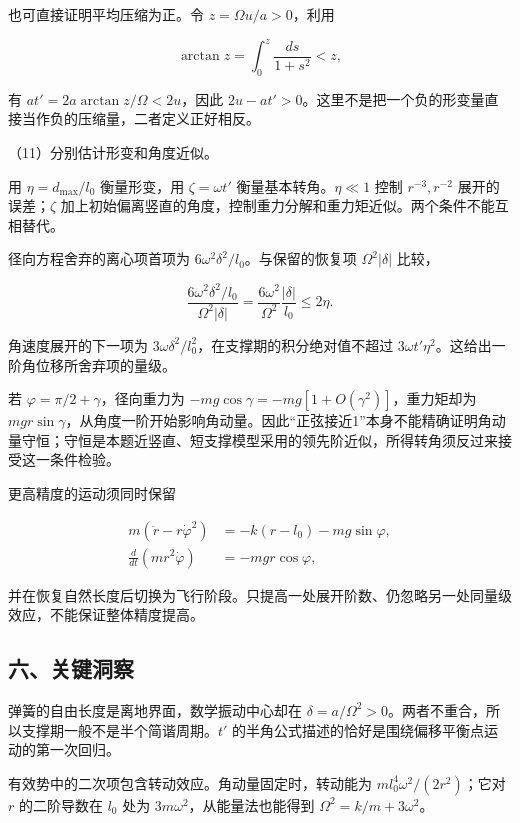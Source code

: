 \documentclass[12pt,a4paper,fontset=fandol]{ctexart}
\begin{document}
也可直接证明平均压缩为正。令 \(z=\Omega u/a>0\)，利用

\[
\arctan z=\int_0^z\frac{ds}{1+s^2}<z,
\]

有 \(at'=2a\arctan z/\Omega<2u\)，因此
\(2u-at'>0\)。这里不是把一个负的形变量直接当作负的压缩量，二者定义正好相反。

（11）分别估计形变和角度近似。

用 \(\eta=d_{\max}/l_0\) 衡量形变，用 \(\zeta=\omega t'\)
衡量基本转角。\(\eta\ll1\) 控制 \(r^{-3},r^{-2}\) 展开的误差；\(\zeta\)
加上初始偏离竖直的角度，控制重力分解和重力矩近似。两个条件不能互相替代。

径向方程舍弃的离心项首项为 \(6\omega^2\delta^2/l_0\)。与保留的恢复项
\(\Omega^2|\delta|\) 比较，

\[
\frac{6\omega^2\delta^2/l_0}{\Omega^2|\delta|}
=\frac{6\omega^2}{\Omega^2}\frac{|\delta|}{l_0}
\le2\eta.
\]

角速度展开的下一项为
\(3\omega\delta^2/l_0^2\)，在支撑期的积分绝对值不超过
\(3\omega t'\eta^2\)。这给出一阶角位移所舍弃项的量级。

若 \(\varphi=\pi/2+\gamma\)，径向重力为
\(-mg\cos\gamma=-mg[1+O(\gamma^2)]\)，重力矩却为
\(mgr\sin\gamma\)，从角度一阶开始影响角动量。因此``正弦接近1''本身不能精确证明角动量守恒；守恒是本题近竖直、短支撑模型采用的领先阶近似，所得转角须反过来接受这一条件检验。

更高精度的运动须同时保留

\[
\begin{aligned}
m(\ddot r-r\dot\varphi^2)&=-k(r-l_0)-mg\sin\varphi,\\
\frac d{dt}(mr^2\dot\varphi)&=-mgr\cos\varphi,
\end{aligned}
\]

并在恢复自然长度后切换为飞行阶段。只提高一处展开阶数、仍忽略另一处同量级效应，不能保证整体精度提高。

\subsection{六、关键洞察}\label{ux516dux5173ux952eux6d1eux5bdf-1}

弹簧的自由长度是离地界面，数学振动中心却在
\(\delta=a/\Omega^2>0\)。两者不重合，所以支撑期一般不是半个简谐周期。\(t'\)
的半角公式描述的恰好是围绕偏移平衡点运动的第一次回归。

有效势中的二次项包含转动效应。角动量固定时，转动能为
\(m l_0^4\omega^2/(2r^2)\)；它对 \(r\) 的二阶导数在 \(l_0\) 处为
\(3m\omega^2\)，从能量法也能得到 \(\Omega^2=k/m+3\omega^2\)。
\end{document}
